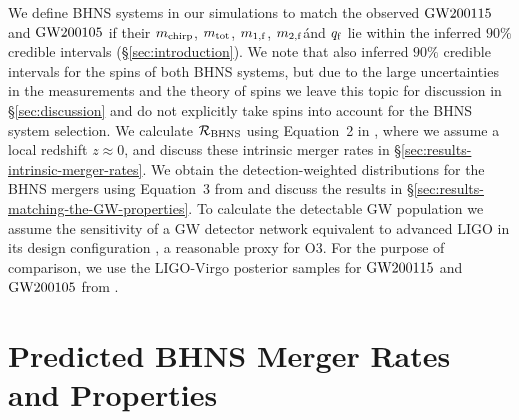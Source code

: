 \documentclass{aastex63}
\newcommand{\monef}{\ensuremath{m_{1,\rm{f}}}\xspace}
\newcommand{\mtwof}{\ensuremath{m_{2,\rm{f}}}\xspace}
\newcommand{\mtotf}{\ensuremath{m_{\rm{tot}}}\xspace}
\newcommand{\mchirpf}{\ensuremath{{m}_{\rm{chirp}}}\xspace}
\newcommand{\qf}{\ensuremath{q_{\rm{f}}}\xspace}
\newcommand{\Rbhns}{\ensuremath{\mathcal{R}_{\rm{BHNS}}}\xspace}
\newcommand{\gwone}{\ensuremath{\rm{GW200115}}\xspace}
\newcommand{\gwzero}{\ensuremath{\rm{GW200105}}\xspace}
\begin{document}
We define \ac{BHNS} systems in our simulations to match the observed \gwone and \gwzero if their \mchirpf, \mtotf, \monef, \mtwof \'{a}nd \qf lie within the inferred $90\%$ credible intervals (\S\ref{sec:introduction}). We note that \citet{Abbott:2021-first-NSBH} also inferred $90\%$ credible intervals for the spins of both \ac{BHNS} systems, but due to the large uncertainties in the measurements and the theory of spins we leave this topic for discussion in \S\ref{sec:discussion} and do not explicitly take spins into account for the \ac{BHNS} system selection. We calculate \Rbhns using Equation~2 in  \citet{Broekgaarden:2021}, where we assume a local redshift $z\approx 0$, and discuss these intrinsic merger rates in \S\ref{sec:results-intrinsic-merger-rates}. We obtain the detection-weighted distributions for the \ac{BHNS} mergers using Equation~3 from \citet{Broekgaarden:2021} and discuss the results in \S\ref{sec:results-matching-the-GW-properties}. To calculate the detectable \ac{GW} population we assume the sensitivity of a GW detector network equivalent to advanced LIGO in its design configuration \citep{2015CQGra..32g4001L, 2016LRR....19....1A, 2018LRR....21....3A}, a reasonable proxy for O3. For the purpose of comparison, we use the LIGO-Virgo posterior samples for \gwone and \gwzero from \citet{Abbott:2021-open-GWTC-data}.


\section{Predicted BHNS Merger Rates and Properties}
\label{sec:results}
\end{document}
